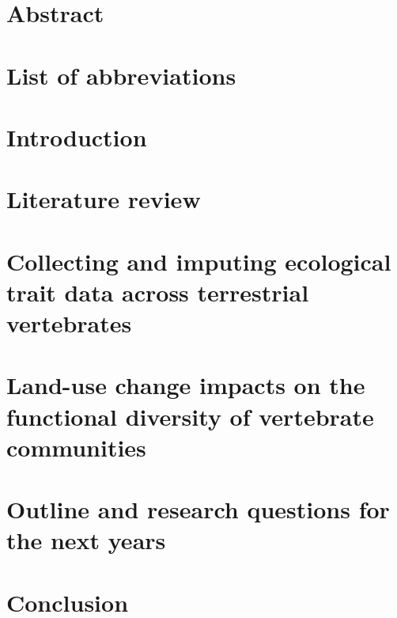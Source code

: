 \documentclass[11pt]{report}
\begin{document}




\chapter*{Abstract}


\clearpage
\tableofcontents


\clearpage
\listoftables

\listoffigures



\chapter*{List of abbreviations}


\clearpage
\chapter{Introduction}


\chapter{Literature review}


\pagebreak
\chapter{Collecting and imputing ecological trait data across terrestrial vertebrates}


\chapter{Land-use change impacts on the functional diversity of vertebrate communities}

\chapter{Outline and research questions for the next years}

\chapter{Conclusion}
\end{document}
